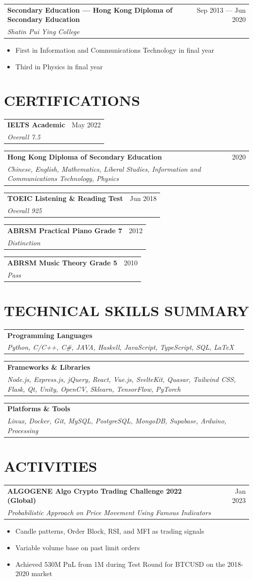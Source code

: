 \documentclass{article}
\newcommand{\jobTitle}[3]{
\vspace{0.4cm}
\begin{tabularx}{0.99\linewidth}{ X r }
    \textbf{#1} & #2\\
    \textit{#3} &
\end{tabularx}
\vspace{0.2cm}
}
\newenvironment{descitemize}
{ \begin{itemize}[leftmargin=1.4cm,,topsep=0pt]
    \setlength{\parskip}{0pt}
    \setlength{\parsep}{0pt}     }
{ \end{itemize}                  }
\begin{document}
\jobTitle
{Secondary Education --- Hong Kong Diploma of Secondary Education}
{Sep 2013 --- Jun 2020}
{Shatin Pui Ying College}
\begin{descitemize}
    \item First in Information and Communications Technology in final year
    \item Third in Physics in final year
\end{descitemize}

\vspace{3cm}
\section{CERTIFICATIONS}

\jobTitle
{IELTS Academic}
{May 2022}
{Overall 7.5}

\jobTitle
{Hong Kong Diploma of Secondary Education}
{2020}
{Chinese, English, Mathematics, Liberal Studies, Information and Communications Technology, Physics}

\jobTitle
{TOEIC Listening \& Reading Test}
{Jun 2018}
{Overall 925}

\jobTitle
{ABRSM Practical Piano Grade 7}
{2012}
{Distinction}

\jobTitle
{ABRSM Music Theory Grade 5}
{2010}
{Pass}

\section{TECHNICAL SKILLS SUMMARY}

\jobTitle
{Programming Languages}
{}
{Python, C/C++, C\#, JAVA, Haskell, JavaScript, TypeScript, SQL, \LaTeX}

\jobTitle
{Frameworks \& Libraries}
{}
{Node.js, Express.js, jQuery, React, Vue.js, SvelteKit, Quasar, Tailwind CSS, Flask, Qt, Unity, OpenCV, Sklearn, TensorFlow, PyTorch}

\jobTitle
{Platforms \& Tools}
{}
{Linux, Docker, Git, MySQL, PostgreSQL, MongoDB, Supabase, Arduino, Processing}

\section{ACTIVITIES}

\jobTitle
{ALGOGENE Algo Crypto Trading Challenge 2022 (Global)}
{Jan 2023}
{Probabilistic Approach on Price Movement Using Famous Indicators}
\begin{descitemize}
    \item Candle patterns, Order Block, RSI, and MFI as trading signals
    \item Variable volume base on past limit orders
    \item Achieved 530M PnL from 1M during Test Round for BTCUSD on the 2018-2020 market
\end{descitemize}
\end{document}
